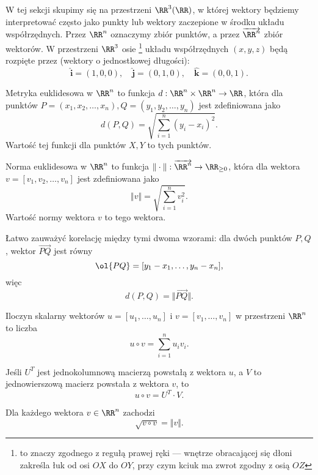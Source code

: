 W tej sekcji skupimy się na przestrzeni $\RR^3(\RR)$, w której wektory będziemy interpretować często jako punkty lub wektory zaczepione w środku układu współrzędnych. Przez $\RR^n$ oznaczymy zbiór punktów, a przez $\overrightarrow{\RR^n}$ zbiór wektorów. W przestrzeni $\RR^3$ osie \footnote{to znaczy zgodnego z regułą prawej ręki --- wnętrze obracającej się dłoni zakreśla łuk od osi $OX$ do $OY$, przy czym kciuk ma zwrot zgodny z osią $OZ$} układu współrzędnych $(x, y, z)$ będą rozpięte przez  (wektory o jednostkowej długości):
\[ \mathbf{\hat{i}} = (1, 0, 0), \quad \mathbf{\hat{j}} = (0, 1, 0), \quad \mathbf{\hat{k}} = (0, 0, 1). \]

\begin{definition}
    \label{d:Euclidean metric}
    Metryka euklidesowa w $\RR^n$ to funkcja $d : \RR^n \times \RR^n \to \RR$, która dla punktów $P = (x_1, x_2, \ldots, x_n), Q = (y_1, y_2, \ldots, y_n)$ jest zdefiniowana jako
    \[ d(P, Q) = \sqrt{\sum_{i = 1}^n (y_i - x_i)^2}. \]
    Wartość tej funkcji dla punktów $X, Y$ to  tych punktów.
\end{definition}

\begin{definition}
    Norma euklidesowa w $\RR^n$ to funkcja $\Vert\cdot\Vert : \overrightarrow{\RR^n} \to \RR_{\geq 0}$, która dla wektora $v = [v_1, v_2, \ldots, v_n]$ jest zdefiniowana jako
    \[ \Vert v\Vert = \sqrt{\sum_{i=1}^n v_i^2}. \]
    Wartość normy wektora $v$ to  tego wektora.
\end{definition}

Łatwo zauważyć korelację między tymi dwoma wzorami: dla dwóch punktów $P, Q$, wektor $\overrightarrow{PQ}$ jest równy
\[ \ol{PQ} = [y_1 - x_1, \ldots, y_n - x_n], \]
więc
\[ d(P, Q) = \Vert\overrightarrow{PQ}\Vert. \]

\begin{definition}
    Iloczyn skalarny wektorów $u = [u_1, \ldots, u_n]$ i $v = [v_1, \ldots, v_n]$ w przestrzeni $\RR^n$ to liczba
    \[ u \circ v = \sum_{i=1}^n u_iv_i. \]
\end{definition}

\begin{fact}
    Jeśli $U^T$ jest jednokolumnową macierzą powstałą z wektora $u$, a $V$ to jednowierszową macierz powstała z wektora $v$, to
    \[ u \circ v = U^T \cdot V. \]
\end{fact}

\begin{fact}
    Dla każdego wektora $v \in \RR^n$ zachodzi
    \[ \sqrt{v \circ v} = \Vert v \Vert. \]
\end{fact}

